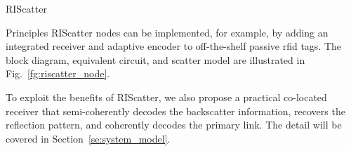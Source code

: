 \documentclass[journal]{IEEEtran}
\begin{document}
\begin{section}{RIScatter}
\begin{subsection}{Principles}
		RIScatter nodes can be implemented, for example, by adding an integrated receiver \cite{Kim2021a} and adaptive encoder \cite{He2020e} to off-the-shelf passive \gls{rfid} tags.
		The block diagram, equivalent circuit, and scatter model are illustrated in Fig.~\ref{fg:riscatter_node}.
		\begin{figure*}[!t]
			\centering
			\caption{
			Block diagram, equivalent circuit, and scatter model of a RIScatter node.
			The solid and dashed vectors represent signal and energy flows.
			The scatter antenna behaves as a constant power source, where the voltage $V_0$ and current $I_0$ are introduced by incident electric field $\vec{E}_{\text{I}}$ and magnetic field $\vec{H}_{\text{I}}$ \cite{Huang2021}.
			}
			\label{fg:riscatter_node}
		\end{figure*}
		To exploit the benefits of RIScatter, we also propose a practical co-located receiver that semi-coherently decodes the backscatter information, recovers the reflection pattern, and coherently decodes the primary link.
		The detail will be covered in Section~\ref{se:system_model}.
	\end{subsection}



\end{section}
\end{document}
